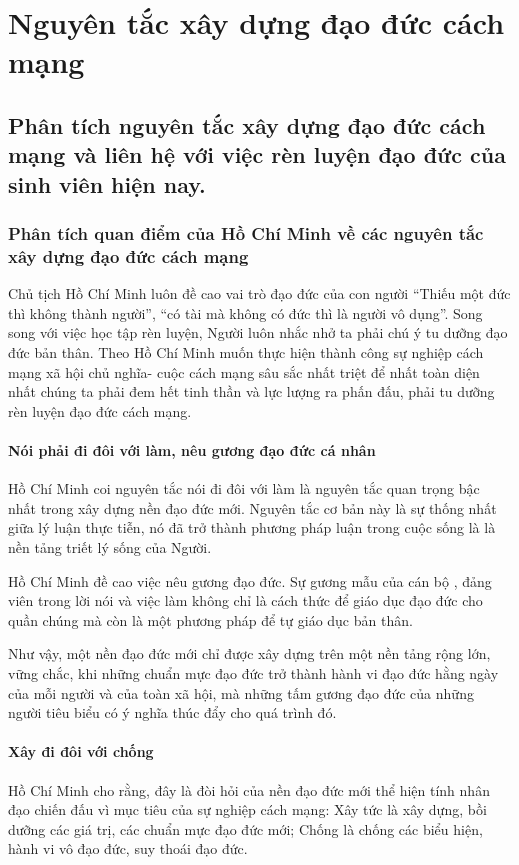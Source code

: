 \section{Nguyên tắc xây dựng đạo đức cách mạng}

\subsection{Phân tích nguyên tắc xây dựng đạo đức cách mạng và liên hệ với việc rèn luyện đạo đức của sinh viên hiện nay.}

\subsubsection{Phân tích quan điểm của Hồ Chí Minh về các nguyên tắc xây dựng đạo đức cách mạng}

Chủ tịch Hồ Chí Minh luôn đề cao vai trò đạo đức của con người “Thiếu một đức thì không thành người”, “có tài mà không có đức thì là người vô dụng”. Song song với việc học tập rèn luyện, Người luôn nhắc nhở ta phải chú ý tu dưỡng đạo đức bản thân. Theo Hồ Chí Minh muốn thực hiện thành công sự nghiệp cách mạng xã hội chủ nghĩa- cuộc cách mạng sâu sắc nhất triệt để nhất toàn diện nhất chúng ta phải đem hết tinh thần và lực lượng ra phấn đấu, phải tu dưỡng rèn luyện đạo đức cách mạng.

\paragraph{Nói phải đi đôi với làm, nêu gương đạo đức cá nhân}
Hồ Chí Minh coi nguyên tắc nói đi đôi với làm là nguyên tắc quan trọng bậc nhất trong xây dựng nền đạo đức mới. Nguyên tắc cơ bản này là sự thống nhất giữa lý luận thực tiễn, nó đã trở thành phương pháp luận trong cuộc sống là là nền tảng triết lý sống của Người.

Hồ Chí Minh đề cao việc nêu gương đạo đức. Sự gương mẫu của cán bộ , đảng viên trong lời nói và việc làm không chỉ là cách thức để giáo dục đạo đức cho quần chúng mà còn là một phương pháp để tự giáo dục bản thân.

Như vậy, một nền đạo đức mới chỉ được xây dựng trên một nền tảng rộng lớn, vững chắc, khi những chuẩn mực đạo đức trở thành hành vi đạo đức hằng ngày của mỗi người và của toàn xã hội, mà những tấm gương đạo đức của những người tiêu biểu có ý nghĩa thúc đẩy cho quá trình đó.

\paragraph{Xây đi đôi với chống}
Hồ Chí Minh cho rằng, đây là đòi hỏi của nền đạo đức mới thể hiện tính nhân đạo chiến đấu vì mục tiêu của sự nghiệp cách mạng: Xây tức là xây dựng, bồi dưỡng các giá trị, các chuẩn mực đạo đức mới; Chống là chống các biểu hiện, hành vi vô đạo đức, suy thoái đạo đức.


